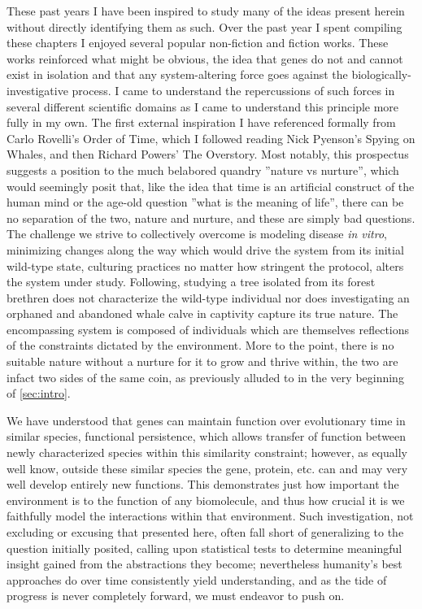 These past years I have been inspired to study many of the ideas present herein without directly identifying them as such. Over the past year I spent compiling these chapters I enjoyed several popular non-fiction and fiction works. These works reinforced what might be obvious, the idea that genes do not and cannot exist in isolation and that any system-altering force goes against the biologically-investigative process. I came to understand the repercussions of such forces in several different scientific domains as I came to understand this principle more fully in my own. The first external inspiration I have referenced formally from Carlo Rovelli's Order of Time\citep{rovelli}, which I followed reading Nick Pyenson's Spying on Whales\citep{pyenson},  and then Richard Powers' The Overstory\citep{powers}. Most notably, this prospectus suggests a position to the much belabored quandry ''nature vs nurture'', which would seemingly posit that, like the idea that time is an artificial construct of the human mind or the age-old question ''what is the meaning of life'', there can be no separation of the two, nature and nurture, and these are simply bad questions. The challenge we strive to collectively overcome is modeling disease \emph{in vitro}, minimizing changes along the way which would drive the system from its initial wild-type state, \eg culturing practices no matter how stringent the protocol, alters the system under study. Following, studying a tree isolated from its forest brethren does not characterize the wild-type individual nor does investigating an orphaned and abandoned whale calve in captivity capture its true nature. The encompassing system is composed of individuals which are themselves reflections of the constraints dictated by the environment. More to the point, there is no suitable nature without a nurture for it to grow and thrive within, the two are infact two sides of the same coin, as previously alluded to in the very beginning of \cref{sec:intro}.

We have understood that genes can maintain function over evolutionary time in similar species, \ie functional persistence, which allows transfer of function between newly characterized species within this similarity constraint; however, as equally well know, outside these similar species the gene, protein, etc. can and may very well develop entirely new functions. This demonstrates just how important the environment is to the function of any biomolecule, and thus how crucial it is we faithfully model the interactions within that environment. Such investigation, not excluding or excusing that presented here, often fall short of generalizing to the question initially posited, calling upon statistical tests to determine meaningful insight gained from the abstractions they become; nevertheless humanity's best approaches do over time consistently yield understanding, and as the tide of progress is never completely forward, we must endeavor to push on.

